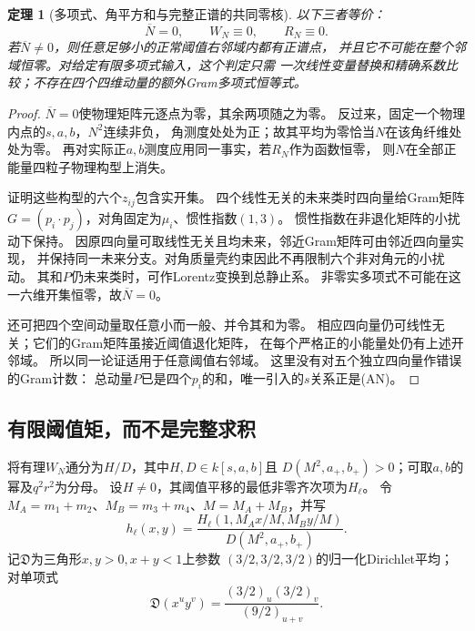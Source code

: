 \documentclass[11pt,a4paper]{ctexart}
\theoremstyle{cnplain}\newtheorem{theorem}{定理}[section]
\theoremstyle{definition}\newtheorem{definition}[theorem]{定义}
\theoremstyle{remark}\newtheorem{remark}[theorem]{注}
\begin{document}
\begin{theorem}[多项式、角平方和与完整正谱的共同零核]\label{thm:angularzero}
以下三者等价：
\[
 \overline N=0,\qquad W_N\equiv0,\qquad R_N\equiv0.
\]
若$\overline N\ne0$，则任意足够小的正常阈值右邻域内都有正谱点，
并且它不可能在整个邻域恒零。对给定有限多项式输入，这个判定只需
一次线性变量替换和精确系数比较；不存在四个四维动量的额外Gram多项式恒等式。
\end{theorem}
\begin{proof}
$\overline N=0$使物理矩阵元逐点为零，其余两项随之为零。
反过来，固定一个物理内点的$s,a,b$，$N^2$连续非负，
角测度处处为正；故其平均为零恰当$N$在该角纤维处处为零。
再对实际正$a,b$测度应用同一事实，若$R_N$作为函数恒零，
则$N$在全部正能量四粒子物理构型上消失。

证明这些构型的六个$z_{ij}$包含实开集。
四个线性无关的未来类时四向量给Gram矩阵
$G=(p_i\cdot p_j)$，对角固定为$\mu_i$、惯性指数$(1,3)$。
惯性指数在非退化矩阵的小扰动下保持。
因原四向量可取线性无关且均未来，邻近Gram矩阵可由邻近四向量实现，
并保持同一未来分支。对角质量壳约束因此不再限制六个非对角元的小扰动。
其和$P$仍未来类时，可作Lorentz变换到总静止系。
非零实多项式不可能在这一六维开集恒零，故$\overline N=0$。

还可把四个空间动量取任意小而一般、并令其和为零。
相应四向量仍可线性无关；它们的Gram矩阵虽接近阈值退化矩阵，
在每个严格正的小能量处仍有上述开邻域。
所以同一论证适用于任意阈值右邻域。
这里没有对五个独立四向量作错误的Gram计数：
总动量$P$已是四个$p_i$的和，唯一引入的$s$关系正是(AN)。
\end{proof}

\subsection{有限阈值矩，而不是完整求积}
将有理$W_N$通分为$H/D$，其中$H,D\in k[s,a,b]$且
$D(M^2,a_+,b_+)>0$；可取$a,b$的幂及$q^2r^2$为分母。
设$H\ne0$，其阈值平移的最低非零齐次项为$H_\ell$。
令$M_A=m_1+m_2$、$M_B=m_3+m_4$、$M=M_A+M_B$，并写
\[
 h_\ell(x,y)=
 \frac{H_\ell(1,M_Ax/M,M_By/M)}{D(M^2,a_+,b_+)}.
\]
记$\mathfrak D$为三角形$x,y>0,x+y<1$上参数
$(3/2,3/2,3/2)$的归一化Dirichlet平均；对单项式
\[
 \mathfrak D(x^u y^v)=
 \frac{(3/2)_u(3/2)_v}{(9/2)_{u+v}}.
 \tag{AD}\label{eq:angulardirichlet}
\]
\end{document}
